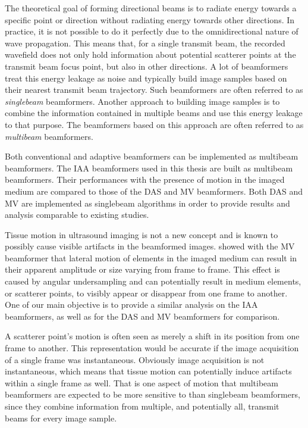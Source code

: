 The theoretical goal of forming directional beams is to radiate energy towards a specific point or direction without radiating energy towards other directions. In practice, it is not possible to do it perfectly due to the omnidirectional nature of wave propagation. This means that, for a single transmit beam, the recorded wavefield does not only hold information about potential scatterer points at the transmit beam focus point, but also in other directions.
A lot of beamformers treat this energy leakage as noise and typically build image samples based on their nearest transmit beam trajectory. Such beamformers are often referred to as \textit{singlebeam} beamformers.
Another approach to building image samples is to combine the information contained in multiple beams and use this energy leakage to that purpose.
The beamformers based on this approach are often referred to as \textit{multibeam} beamformers.

Both conventional and adaptive beamformers can be implemented as multibeam beamformers. The IAA beamformers used in this thesis are built as multibeam beamformers. Their performances with the presence of motion in the imaged medium are compared to those of the DAS and MV beamformers. Both DAS and MV are implemented as singlebeam algorithms in order to provide results and analysis comparable to existing studies.


Tissue motion in ultrasound imaging is not a new concept and is known to possibly cause visible artifacts in the beamformed images. \cite{Asen_shift_invariance} showed with the MV beamformer that lateral motion of elements in the imaged medium can result in their apparent amplitude or size varying from frame to frame. This effect is caused by angular undersampling and can potentially result in medium elements, or scatterer points, to visibly appear or disappear from one frame to another.
One of our main objective is to provide a similar analysis on the IAA beamformers, as well as for the DAS and MV beamformers for comparison.

A scatterer point's motion is often seen as merely a shift in its position from one frame to another. This representation would be accurate if the image acquisition of a single frame was instantaneous.
Obviously image acquisition is not instantaneous, which means that tissue motion can potentially induce artifacts within a single frame as well.
That is one aspect of motion that multibeam beamformers are expected to be more sensitive to than singlebeam beamformers, since they combine information from multiple, and potentially all, transmit beams for every image sample.

